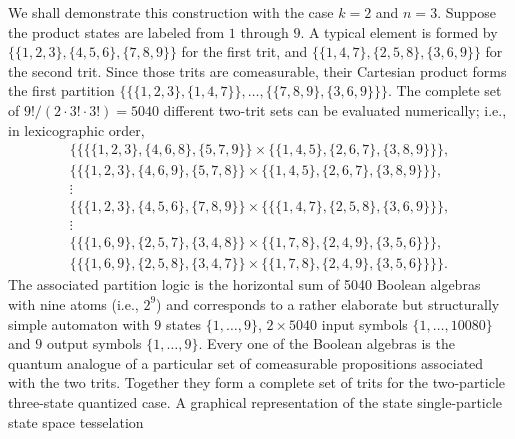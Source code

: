 We shall demonstrate this construction with the case $k=2$ and $n=3$.
Suppose the product states are labeled from $1$ through $9$.
A typical element is formed by
$\{\{1,2,3\},\{4,5,6\},\{7,8,9\}\}$ for the first trit, and
$\{\{1,4,7\},\{2,5,8\},\{3,6,9\}\}$ for the second trit. Since those trits are comeasurable,
their Cartesian product forms the first partition
$
\{
\{\{1,2,3\},\{1,4,7\}\},\ldots ,\{\{7,8,9\},\{3,6,9\}\}
\}
$.
The complete set of $9!/(2\cdot 3!\cdot 3!)= 5040$
different two-trit sets can be evaluated numerically; i.e.,
in lexicographic order,
%
%
%
\begin{eqnarray}
&\{\{\{\{1, 2, 3\}, \{4, 6, 8\}, \{5, 7, 9\}\}\times \{\{1, 4, 5\}, \{2, 6, 7\}, \{3, 8, 9\}\}\},  &\label{2002-kyoto-lb}    \\
&\{\{\{1, 2, 3\}, \{4, 6, 9\}, \{5, 7, 8\}\}\times \{\{1, 4, 5\}, \{2, 6, 7\}, \{3, 8, 9\}\}\},  &\\
&\vdots         \nonumber                                                             &             \\
&\{\{\{1,2,3\},\{4,5,6\},\{7,8,9\}\}\times \{\{\{1,4,7\},\{2,5,8\},\{3,6,9\}\}\} ,                  &     \\
&\vdots         \nonumber                                                             &              \\
&\{\{\{1, 6,   9\}, \{2, 5, 7\}, \{3, 4, 8\}\}\times \{ \{1, 7, 8\}, \{2, 4, 9\}, \{3, 5, 6\}\}\},  &    \\
&\{\{\{1, 6,   9\}, \{2, 5, 8\}, \{3, 4, 7\}\}\times \{ \{1, 7, 8\}, \{2, 4, 9\}, \{3, 5, 6\}\}\}\}.& \label{2002-kyoto-lf}
\end{eqnarray}
The associated partition logic is the horizontal sum of 5040
Boolean algebras with nine atoms (i.e., $2^9$) and corresponds to a rather
elaborate but structurally simple automaton with $9$ states $\{1,\ldots ,9\}$, $2\times 5040$ input symbols
$\{1,\ldots ,10080\}$ and $9$ output symbols $\{1,\ldots ,9\}$.
Every one of the Boolean algebras is the quantum analogue of a particular set of comeasurable
propositions associated with the two trits.
Together they form a complete set of trits for the two-particle three-state quantized case.
A graphical representation of the state single-particle state space tesselation
